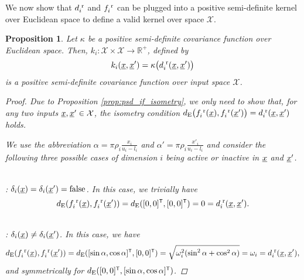 \documentclass{article}
\newcommand{\vect}[1]{\underline{\smash{#1}}}
\renewcommand{\v}[1]{\vect{#1}}
\newcommand{\reals}{\mathds{R}}
\newcommand{\sX}{\mathcal{X}}
\newcommand{\br}{^{\text{\textnormal{ r}}}}
\newcommand\transpose{{\textrm{\tiny{\sf{T}}}}}
\newtheorem{prop}[thm]{Proposition}
\begin{document}
We now show that $d\br_i$ and $f\br_i$ can be plugged into a positive semi-definite kernel over Euclidean space to define a valid kernel over space $\sX$.

\begin{prop}
Let $\kappa$ be a positive semi-definite covariance function over Euclidean space.
Then, $k_i\colon \sX \times \sX\to \reals^+$, defined by 
\[k_i(\v{x},\v{x}') = \kappa\bigl( d\br_i(\v{x}, \v{x}') \bigr)\]
is a positive semi-definite covariance function over input space $\sX$. 
\label{prop:cont_psd}
\begin{proof}
Due to Proposition \ref{prop:psd_if_isometry}, we only need to show that, for any two inputs $\v{x},\v{x}' \in \sX$, the isometry condition $d_{\text{E}}\bigl(f_i\br(\v{x}),f_i\br(\v{x}')\bigr) = d\br_i(\v{x},\v{x}')$ holds.

We use the abbreviation $\alpha = \pi\rho_i\frac{x_i}{u_i-l_i}$ and $\alpha' = \pi\rho_i\frac{x'_i}{u_i-l_i}$ and consider the following three possible cases of dimension $i$ being active or inactive in $\v{x}$ and $\v{x}'$.

~\\: $\delta_i(\v{x}) = \delta_i(\v{x}') = \textrm{false}$.
In this case, we trivially have 
\[d_{\text{E}}(f_i\br(\v{x}),f_i\br(\v{x}')) = d_{\text{E}}([0,0]^\transpose, [0,0]^\transpose) = 0 = d\br_i(\v{x},\v{x}').\]

~\\: $\delta_i(\v{x}) \neq \delta_i(\v{x}')$. In this case, we have
\[d_{\text{E}}(f_i\br(\v{x}),f_i\br(\v{x}')) = d_{\text{E}}([\sin{\alpha}, \cos{\alpha}]^\transpose, [0,0]^\transpose) = \sqrt{\omega_i^2 (\sin^2{\alpha} + \cos^2{\alpha})} = \omega_i = d\br_i(\v{x},\v{x}'),\]
and symmetrically for $d_{\text{E}}([0,0]^\transpose, [\sin{\alpha}, \cos{\alpha}]^\transpose)$.


\end{proof}
\end{prop}
\end{document}
